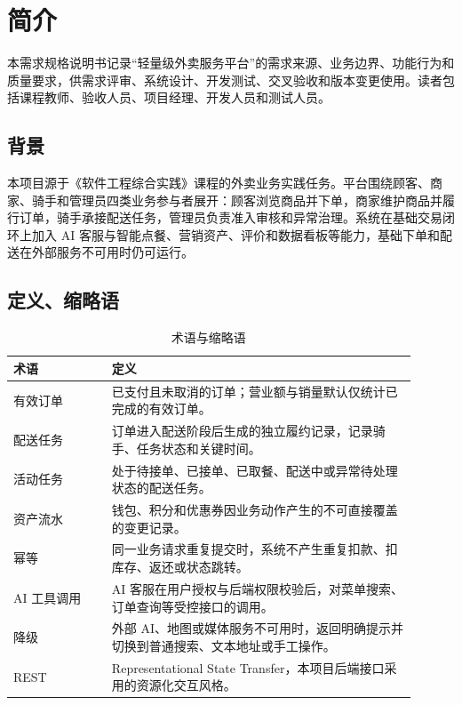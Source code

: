 \section{简介}

本需求规格说明书记录“轻量级外卖服务平台”的需求来源、业务边界、功能行为和质量要求，供需求评审、系统设计、开发测试、交叉验收和版本变更使用。读者包括课程教师、验收人员、项目经理、开发人员和测试人员。

\subsection{背景}

本项目源于《软件工程综合实践》课程的外卖业务实践任务。平台围绕顾客、商家、骑手和管理员四类业务参与者展开：顾客浏览商品并下单，商家维护商品并履行订单，骑手承接配送任务，管理员负责准入审核和异常治理。系统在基础交易闭环上加入 AI 客服与智能点餐、营销资产、评价和数据看板等能力，基础下单和配送在外部服务不可用时仍可运行。

\subsection{定义、缩略语}

\begin{longtable}{|L{0.22\linewidth}|L{0.68\linewidth}|}
\caption{术语与缩略语}\label{tab:terms}\\ \hline
\textbf{术语} & \textbf{定义} \\ \hline
有效订单 & 已支付且未取消的订单；营业额与销量默认仅统计已完成的有效订单。 \\ \hline
配送任务 & 订单进入配送阶段后生成的独立履约记录，记录骑手、任务状态和关键时间。 \\ \hline
活动任务 & 处于待接单、已接单、已取餐、配送中或异常待处理状态的配送任务。 \\ \hline
资产流水 & 钱包、积分和优惠券因业务动作产生的不可直接覆盖的变更记录。 \\ \hline
幂等 & 同一业务请求重复提交时，系统不产生重复扣款、扣库存、返还或状态跳转。 \\ \hline
AI 工具调用 & AI 客服在用户授权与后端权限校验后，对菜单搜索、订单查询等受控接口的调用。 \\ \hline
降级 & 外部 AI、地图或媒体服务不可用时，返回明确提示并切换到普通搜索、文本地址或手工操作。 \\ \hline
REST & Representational State Transfer，本项目后端接口采用的资源化交互风格。 \\ \hline
\end{longtable}

